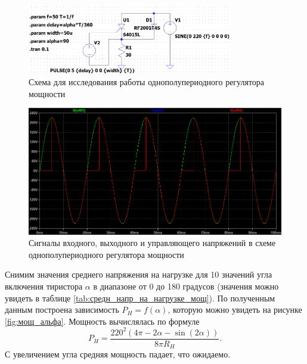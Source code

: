 \begin{figure}[H]
    \centering
    \includegraphics[width=0.8\textwidth]{figs/иссл_мощ_схема.png}
    \caption{Схема для исследования работы однополупериодного регулятора мощности}
    \label{fig:иссл_мощ_схема}
\end{figure}

\begin{figure}[H]
    \centering
    \includegraphics[width=1\textwidth]{figs/иссл_мощ.png}
    \caption{Сигналы входного, выходного и управляющего напряжений в схеме 
    однополупериодного регулятора мощности}
    \label{fig:иссл_мощ}
\end{figure}

Снимим значения среднего напряжения на нагрузке для 10
значений угла включения тиристора $\alpha$ в диапазоне от 0
до 180 градусов (значения можно увидеть в таблице \ref{tab:средн_напр_на_нагрузке_мощ}). 
По полученным данным построена зависимость $P_H=f(\alpha)$,
которую можно увидеть на рисунке \ref{fig:мощ_альфа}. Мощность вычислялась по формуле
\begin{equation*}
    P_H=\frac{220^2
        (4\pi-2\alpha-\sin(2\alpha))
    }{8\pi R_H}.
\end{equation*}
С увеличением угла средняя
мощность падает, что ожидаемо.


